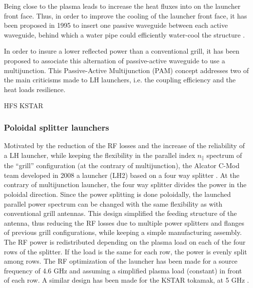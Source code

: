 Being close to the plasma leads to increase the heat fluxes into on the launcher front face. Thus, in order to improve the cooling of the launcher front face, it has been proposed in 1995 to insert one passive waveguide between each active waveguide, behind which a water pipe could efficiently water-cool the structure . 

In order to insure a lower reflected power than a conventional grill, it has been proposed to associate this alternation of passive-active waveguide to  use a multijunction. This Passive-Active Multijunction (PAM) concept addresses two of the main criticisms made to LH launchers, i.e. the coupling efficiency and the heat loads resilience. 



HFS KSTAR


%
%
%

\subsubsection{Poloidal splitter launchers}
Motivated by the reduction of the RF losses and the increase of the reliability of a LH launcher, while keeping the flexibility in the parallel index $n_{\parallel}$ spectrum of the “grill” configuration (at the contrary of multijunction), the Alcator C-Mod team developed in 2008 a launcher (LH2) based on a four way splitter . At the contrary of multijunction launcher, the four way splitter divides the power in the poloidal direction. Since the power splitting is done poloidally, the launched parallel power spectrum can be changed with the same flexibility as with conventional grill antennas. This design simplified the feeding structure of the antenna, thus reducing the RF losses due to multiple power splitters and flanges of previous grill configurations, while keeping a simple manufacturing assembly. The RF power is redistributed depending on the plasma load on each of the four rows of the splitter. If the load is the same for each row, the power is evenly split among rows. The RF optimization of the launcher has been made for a source frequency of 4.6 GHz and assuming a simplified plasma load (constant) in front of each row. A similar design has been made for the KSTAR tokamak, at 5 GHz . 


